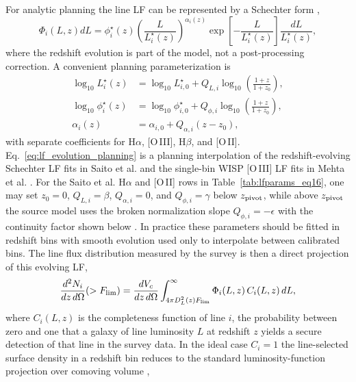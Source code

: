 \documentclass[10pt,onecolumn]{article}
\begin{document}
For analytic planning the line LF can be represented by a Schechter form \cite{schechter1976,saito2020,mehta2015},
\begin{equation}
  \Phi_i(L,z)dL =
  \phi_i^\star(z)
  \left(\frac{L}{L_i^\star(z)}\right)^{\alpha_i(z)}
  \exp\!\left[-\frac{L}{L_i^\star(z)}\right]
  \frac{dL}{L_i^\star(z)} ,
\end{equation}
where the redshift evolution is part of the model, not a post-processing correction. A convenient planning parameterization is
\begin{equation}
  \begin{aligned}
  \log_{10}L_i^\star(z) &=
  \log_{10}L_{i,0}^\star+
  Q_{L,i}\log_{10}\!\left(\frac{1+z}{1+z_0}\right),\\
  \log_{10}\phi_i^\star(z) &=
  \log_{10}\phi_{i,0}^\star+
  Q_{\phi,i}\log_{10}\!\left(\frac{1+z}{1+z_0}\right),\\
  \alpha_i(z) &= \alpha_{i,0}+Q_{\alpha,i}(z-z_0),
  \end{aligned}
  \label{eq:lf_evolution_planning}
\end{equation}
with separate coefficients for H$\alpha$, [O\,III], H$\beta$, and [O\,II]. Eq.~\eqref{eq:lf_evolution_planning} is a planning interpolation of the redshift-evolving Schechter LF fits in Saito et al. \cite{saito2020} and the single-bin WISP [O\,III] LF fits in Mehta et al. \cite{mehta2015}. For the Saito et al. H$\alpha$ and [O\,II] rows in Table~\ref{tab:lfparams_eq16}, one may set $z_0=0$, $Q_{L,i}=\beta$, $Q_{\alpha,i}=0$, and $Q_{\phi,i}=\gamma$ below $z_{\rm pivot}$, while above $z_{\rm pivot}$ the source model uses the broken normalization slope $Q_{\phi,i}=-\epsilon$ with the continuity factor shown below \cite{saito2020}. In practice these parameters should be fitted in redshift bins with smooth evolution used only to interpolate between calibrated bins. The line flux distribution measured by the survey is then a direct projection of this evolving LF,
\begin{equation}
  \frac{d^2N_i}{dz\,d\Omega}(>F_{\rm lim}) =
  \frac{dV_c}{dz\,d\Omega}
  \int_{4\pi D_L^2(z)F_{\rm lim}}^\infty
  \Phi_i(L,z)\,C_i(L,z)\,dL ,
\end{equation}
where $C_i(L,z)$ is the completeness function of line $i$, the probability between zero and one that a galaxy of line luminosity $L$ at redshift $z$ yields a secure detection of that line in the survey data. In the ideal case $C_i=1$ the line-selected surface density in a redshift bin reduces to the standard luminosity-function projection over comoving volume \cite{schechter1976,saito2020,mehta2015},
\end{document}
